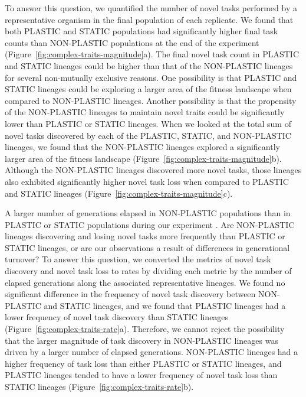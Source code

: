 To answer this question, we quantified the number of novel tasks performed by a representative organism in the final population of each replicate.
We found that both PLASTIC and STATIC populations had significantly higher final task counts than NON-PLASTIC populations at the end of the experiment (Figure~\ref{fig:complex-traits-magnitude}a). 
The final novel task count in PLASTIC and STATIC lineages could be higher than that of the NON-PLASTIC lineages for several non-mutually exclusive reasons. 
One possibility is that PLASTIC and STATIC lineages could be exploring a larger area of the fitness landscape when compared to NON-PLASTIC lineages. 
Another possibility is that the propensity of the NON-PLASTIC lineages to maintain novel traits could be significantly lower than PLASTIC or STATIC lineages. 
When we looked at the total sum of novel tasks discovered by each of the PLASTIC, STATIC, and NON-PLASTIC lineages, we found that the NON-PLASTIC lineages explored a significantly larger area of the fitness landscape (Figure~\ref{fig:complex-traits-magnitude}b).
Although the NON-PLASTIC lineages discovered more novel tasks, those lineages also exhibited significantly higher novel task loss when compared to PLASTIC and STATIC lineages (Figure~\ref{fig:complex-traits-magnitude}c). 



A larger number of generations elapsed in NON-PLASTIC populations than in PLASTIC or STATIC populations during our experiment \citep{supplemental_material}.
Are NON-PLASTIC lineages discovering and losing novel tasks more frequently than PLASTIC or STATIC lineages, or are our observations a result of differences in generational turnover?
To answer this question, we converted the metrics of novel task discovery and novel task loss to rates by dividing each metric by the number of elapsed generations along the associated representative lineages.
We found no significant difference in the frequency of novel task discovery between NON-PLASTIC and STATIC lineages, and we found that PLASTIC lineages had a lower frequency of novel task discovery than STATIC lineages (Figure~\ref{fig:complex-traits-rate}a).
Therefore, we cannot reject the possibility that the larger magnitude of task discovery in NON-PLASTIC lineages was driven by a larger number of elapsed generations.
NON-PLASTIC lineages had a higher frequency of task loss than either PLASTIC or STATIC lineages, and PLASTIC lineages tended to have a lower frequency of novel task loss than STATIC lineages (Figure~\ref{fig:complex-traits-rate}b). 


